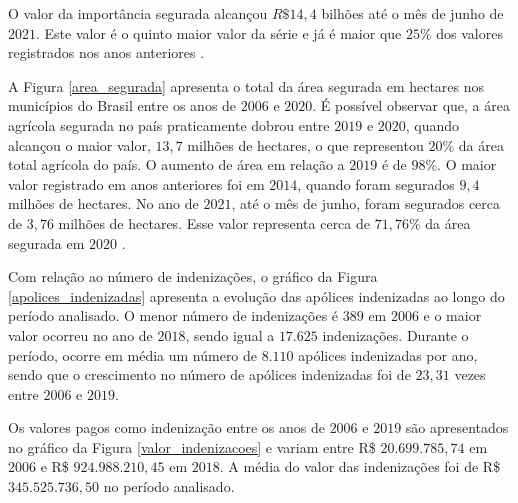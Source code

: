 O valor da importância segurada alcançou $R\$14,4$ bilhões até o mês de junho de $2021$. Este valor é o quinto maior valor da série e já é maior que $25\%$ dos valores registrados nos anos anteriores \cite{brasil21b}. 


A Figura \ref{area_segurada} apresenta o total da área segurada em hectares nos municípios do Brasil entre os anos de  $2006$ e  $2020$. É possível observar que, a área agrícola segurada no país praticamente dobrou entre $2019$ e $2020$, quando alcançou o maior valor, $13,7$ milhões de hectares, o que representou $20\%$ da área total agrícola do país. O aumento de área em relação a $2019$ é de $98\%$. O maior valor registrado em anos anteriores foi em $2014$, quando foram segurados $9,4$ milhões de hectares. No ano de $2021$, até o mês de junho, foram segurados cerca de $3,76$ milhões de hectares. Esse valor representa cerca de $71,76\%$ da área segurada em $2020$ \cite{brasil21b}. 


Com relação ao número de indenizações,  o gráfico da Figura \ref{apolices_indenizadas} apresenta a evolução das apólices indenizadas ao longo do período analisado. O menor número de indenizações é $389$ em $2006$ e o maior valor ocorreu no ano de $2018$, sendo igual a $17.625$ indenizações. Durante o período, ocorre em média um número de $8.110$ apólices indenizadas por ano, sendo que o crescimento no número de apólices indenizadas foi de $23,31$ vezes entre $2006$ e $2019$. 

Os valores pagos como indenização entre os anos de $2006$ e $2019$ são apresentados no gráfico da Figura \ref{valor_indenizacoes} e variam entre R\$ $20.699.785,74$ em $2006$ e R\$ $924.988.210,45$ em $2018$. A média do valor das indenizações foi de R\$ $345.525.736,50$ no período analisado. 

%         

